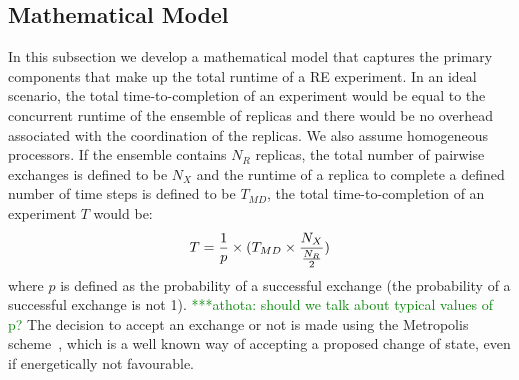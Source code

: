 \documentclass{rspublic}
\newcommand{\athotanote}[1]{ {\textcolor{green} { ***athota: #1 }}}
\newcommand{\athotanote}[1]{}
\begin{document}
\subsection{Mathematical Model}
\label{sec:math-model}
In this subsection we develop a mathematical model that captures
the primary components that make up the total runtime of a RE
experiment. In an ideal scenario, the total time-to-completion of an
experiment would be equal to the concurrent runtime of the ensemble of
replicas and there would be no overhead associated with the
coordination of the replicas. We also assume homogeneous processors. If the ensemble contains $N_R$
replicas, the total number of pairwise exchanges is defined to be $N_X$ and the
runtime of a replica to complete a defined number of time steps is defined to be
$T_{MD}$, the total time-to-completion of an experiment $T$ would
be:
\begin{eqnarray}
T = {1\over p} \times (T_{MD} \times  {N_X \over {N_R \over 2}}) 
\label{eq:totaltime1}
\end{eqnarray}
where $p$ is defined as the probability of a successful exchange (the
probability of a successful exchange is not 1). \athotanote{should we talk about typical values of p?} The decision to accept
an exchange or not is made using the Metropolis
scheme~\citep{metropolis:1087}, which is a well known way of accepting
a proposed change of state, even if energetically not favourable.

\end{document}
